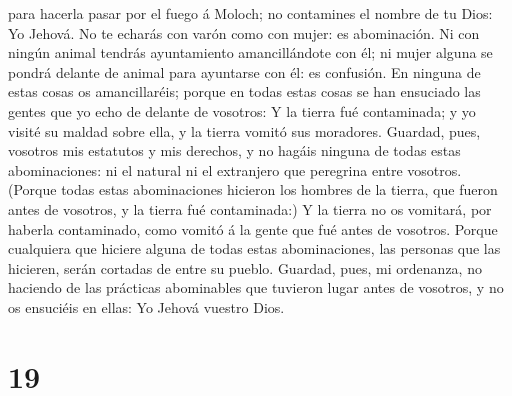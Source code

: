 para hacerla pasar por el fuego á Moloch; no contamines el nombre de tu
Dios: Yo Jehová.  No te echarás con varón como con mujer:
es abominación.  Ni con ningún animal tendrás
ayuntamiento amancillándote con él; ni mujer alguna se pondrá delante de
animal para ayuntarse con él: es confusión.  En ninguna
de estas cosas os amancillaréis; porque en todas estas cosas se han
ensuciado las gentes que yo echo de delante de vosotros: 
Y la tierra fué contaminada; y yo visité su maldad sobre ella, y la
tierra vomitó sus moradores.  Guardad, pues, vosotros mis
estatutos y mis derechos, y no hagáis ninguna de todas estas
abominaciones: ni el natural ni el extranjero que peregrina entre
vosotros.  (Porque todas estas abominaciones hicieron los
hombres de la tierra, que fueron antes de vosotros, y la tierra fué
contaminada:)  Y la tierra no os vomitará, por haberla
contaminado, como vomitó á la gente que fué antes de vosotros.
 Porque cualquiera que hiciere alguna de todas estas
abominaciones, las personas que las hicieren, serán cortadas de entre su
pueblo.  Guardad, pues, mi ordenanza, no haciendo de las
prácticas abominables que tuvieron lugar antes de vosotros, y no os
ensuciéis en ellas: Yo Jehová vuestro Dios.

\hypertarget{section-18}{%
\section{19}\label{section-18}}

